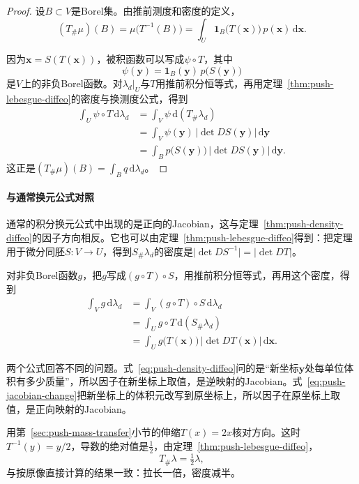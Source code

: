 \begin{proof}
设$B\subset V$是Borel集。由推前测度和密度的定义，
\[
(T_\#\mu)(B)=\mu\bigl(T^{-1}(B)\bigr)=\int_U\mathbf 1_B\bigl(T(\bm x)\bigr)\,p(\bm x)\,\mathrm d\bm x .
\]

因为$\bm x=S(T(\bm x))$，被积函数可以写成$\psi\circ T$，其中
\[
\psi(\bm y)=\mathbf 1_B(\bm y)\,p\bigl(S(\bm y)\bigr)
\]
是$V$上的非负Borel函数。对$\lambda_d|_U$与$T$用推前积分恒等式，再用定理~\ref{thm:push-lebesgue-diffeo}的密度与换测度公式，得到
\[
\begin{aligned}
\int_U\psi\circ T\,\mathrm d\lambda_d&=\int_V\psi\,\mathrm d(T_\#\lambda_d)\\
&=\int_V\psi(\bm y)\,\lvert\det DS(\bm y)\rvert\,\mathrm d\bm y\\
&=\int_Bp\bigl(S(\bm y)\bigr)\,\lvert\det DS(\bm y)\rvert\,\mathrm d\bm y .
\end{aligned}
\]
这正是$(T_\#\mu)(B)=\int_Bq\,\mathrm d\lambda_d$。
\end{proof}

\paragraph{与通常换元公式对照}
通常的积分换元公式中出现的是正向的Jacobian，这与定理~\ref{thm:push-density-diffeo}的因子方向相反。它也可以由定理~\ref{thm:push-lebesgue-diffeo}得到：把定理用于微分同胚$S:V\to U$，得到$S_\#\lambda_d$的密度是$\lvert\det DS^{-1}\rvert=\lvert\det DT\rvert$。

对非负Borel函数$g$，把$g$写成$(g\circ T)\circ S$，用推前积分恒等式，再用这个密度，得到
\begin{equation}
\begin{aligned}
\int_Vg\,\mathrm d\lambda_d&=\int_V(g\circ T)\circ S\,\mathrm d\lambda_d\\
&=\int_Ug\circ T\,\mathrm d(S_\#\lambda_d)\\
&=\int_Ug\bigl(T(\bm x)\bigr)\,\lvert\det DT(\bm x)\rvert\,\mathrm d\bm x .
\end{aligned}
\label{eq:push-jacobian-change}
\end{equation}

两个公式回答不同的问题。式~\eqref{eq:push-density-diffeo}问的是“新坐标$\bm y$处每单位体积有多少质量”，所以因子在新坐标上取值，是逆映射的Jacobian。式~\eqref{eq:push-jacobian-change}把新坐标上的体积元改写到原坐标上，所以因子在原坐标上取值，是正向映射的Jacobian。

用第~\ref{sec:push-mass-transfer}小节的伸缩$T(x)=2x$核对方向。这时$T^{-1}(y)=y/2$，导数的绝对值是$\tfrac12$，由定理~\ref{thm:push-lebesgue-diffeo}，
\[
T_\#\lambda=\tfrac12\lambda ,
\]
与按原像直接计算的结果一致：拉长一倍，密度减半。

